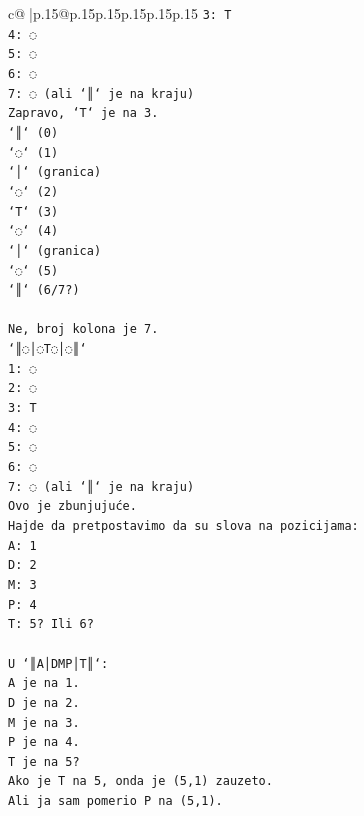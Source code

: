 \documentclass{article}
\begin{document}
{\begin{supertabular}{c@{$\;$}|p{.15\linewidth}@{}p{.15\linewidth}p{.15\linewidth}p{.15\linewidth}p{.15\linewidth}p{.15\linewidth}}
{{{\texttt{3: T} \\
\texttt{4: ◌} \\
\texttt{5: ◌} \\
\texttt{6: ◌} \\
\texttt{7: ◌ (ali `║` je na kraju)} \\
\texttt{Zapravo, `T` je na 3.} \\
\texttt{`║` (0)} \\
\texttt{`◌` (1)} \\
\texttt{`│` (granica)} \\
\texttt{`◌` (2)} \\
\texttt{`T` (3)} \\
\texttt{`◌` (4)} \\
\texttt{`│` (granica)} \\
\texttt{`◌` (5)} \\
\texttt{`║` (6/7?)} \\
\\ 
\texttt{Ne, broj kolona je 7.} \\
\texttt{`║◌│◌T◌│◌║`} \\
\texttt{1: ◌} \\
\texttt{2: ◌} \\
\texttt{3: T} \\
\texttt{4: ◌} \\
\texttt{5: ◌} \\
\texttt{6: ◌} \\
\texttt{7: ◌ (ali `║` je na kraju)} \\
\texttt{Ovo je zbunjujuće.} \\
\texttt{Hajde da pretpostavimo da su slova na pozicijama:} \\
\texttt{A: 1} \\
\texttt{D: 2} \\
\texttt{M: 3} \\
\texttt{P: 4} \\
\texttt{T: 5? Ili 6?} \\
\\ 
\texttt{U `║A│DMP│T║`:} \\
\texttt{A je na 1.} \\
\texttt{D je na 2.} \\
\texttt{M je na 3.} \\
\texttt{P je na 4.} \\
\texttt{T je na 5?} \\
\texttt{Ako je T na 5, onda je (5,1) zauzeto.} \\
\texttt{Ali ja sam pomerio P na (5,1).} \\
}}}
\end{supertabular}}
\end{document}
